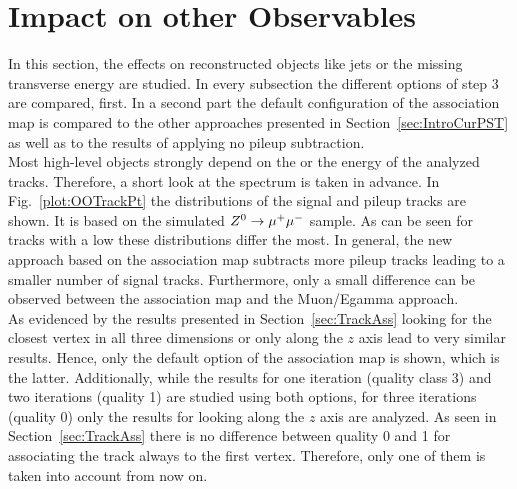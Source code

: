 \chapter{Impact on other Observables \label{sec:OO}}

In this section, the effects on reconstructed objects like jets or the missing transverse energy are studied. In every subsection the different options of step 3 are compared, first. In a second part the default configuration of the association map is compared to the other approaches presented in Section~\ref{sec:IntroCurPST} as well as to the results of applying no pileup subtraction. \\
Most high-level objects strongly depend on the \pt or the energy of the analyzed tracks. Therefore, a short look at the \pt spectrum is taken in advance. In Fig.~\ref{plot:OOTrackPt} the \pt distributions of the signal and pileup tracks are shown. It is based on the simulated ${Z^{0}}\rightarrow\mu^+\mu^-$ sample. As can be seen for tracks with a low \pt these distributions differ the most. In general, the new approach based on the association map subtracts more pileup tracks leading to a smaller number of signal tracks. Furthermore, only a small difference can be observed between the association map and the Muon/Egamma approach.  \\
As evidenced by the results presented in Section~\ref{sec:TrackAss} looking for the closest vertex in all three dimensions or only along the $z$ axis lead to very similar results. Hence, only the default option of the association map is shown, which is the latter. Additionally, while the results for one iteration (quality class 3) and two iterations (quality 1) are studied using both options, for three iterations (quality 0) only the results for looking along the $z$ axis are analyzed. As seen in Section~\ref{sec:TrackAss} there is no difference between quality 0 and 1 for associating the track always to the first vertex. Therefore, only one of them is taken into account from now on.

